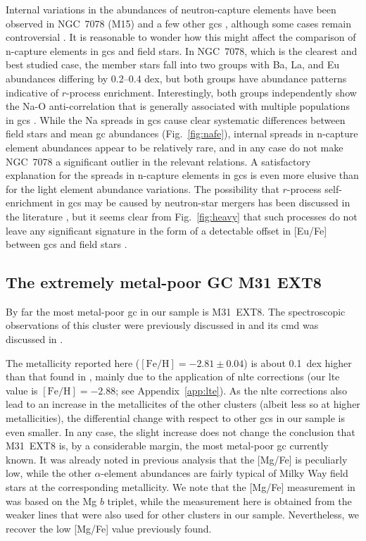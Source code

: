 \documentclass{aa}
\begin{document}
Internal variations in the abundances of neutron-capture elements have been observed in NGC~7078 (M15) and a few other \acp{gc} \citep{Roederer2011b}, although some cases remain controversial \citep{Cohen2011}. It is reasonable to wonder how this might affect the comparison of n-capture elements in \acp{gc} and field stars. In NGC~7078, which is the clearest and best studied case, the member stars fall into two groups with Ba, La, and Eu abundances differing by 0.2--0.4 dex, but both groups have abundance patterns indicative of $r$-process enrichment. Interestingly, both groups independently show the Na-O anti-correlation that is generally associated with multiple populations in \acp{gc} \citep{Sneden1997,Worley2013}. While the Na spreads in \acp{gc} cause clear systematic differences between field stars and mean \ac{gc} abundances (Fig.~\ref{fig:nafe}), internal spreads in n-capture element abundances appear to be relatively rare, and in any case do not make NGC~7078 a significant outlier in the relevant relations. A satisfactory explanation for the spreads in n-capture elements in \acp{gc} is even more elusive than for the light element abundance variations. The possibility that $r$-process self-enrichment in \acp{gc} may be caused by neutron-star mergers has been discussed in the literature \citep[e.g.][]{Zevin2019}, but it seems clear from Fig.~\ref{fig:heavy} that such processes do not leave any significant signature in the form of a detectable offset in [Eu/Fe] between \acp{gc} and field stars \citep[see also][]{Sakari2013}. 


\subsection{The extremely metal-poor GC M31 EXT8}


By far the most metal-poor \ac{gc} in our sample is M31~EXT8. The spectroscopic observations of this cluster were previously discussed in \citet{Larsen2020} and its \ac{cmd} was discussed in \citet{Larsen2021}. 

The metallicity reported here ($\mathrm{[Fe/H]} = -2.81\pm0.04$) is about 0.1~dex higher than that found in \citet{Larsen2020}, mainly due to the application of \ac{nlte} corrections (our \ac{lte} value is $\mathrm{[Fe/H]}=-2.88$; see Appendix~\ref{app:lte}). 
As the \ac{nlte} corrections also lead to an increase in the metallicites of the other clusters (albeit less so at higher metallicities), the differential change with respect to other \acp{gc} in our sample is even smaller. In any case, the slight increase does not change the conclusion that M31~EXT8 is, by a considerable margin, the most metal-poor \ac{gc} currently known. It was already noted in previous analysis that the [Mg/Fe] is peculiarly low, while the other $\alpha$-element abundances are fairly typical of Milky Way field stars at the corresponding metallicity. We note that the [Mg/Fe] measurement in \citet{Larsen2020} was based on the Mg $b$ triplet, while the measurement here is obtained from the weaker  lines that were also used for other clusters in our sample. Nevertheless, we recover the low [Mg/Fe] value previously found.
\end{document}
